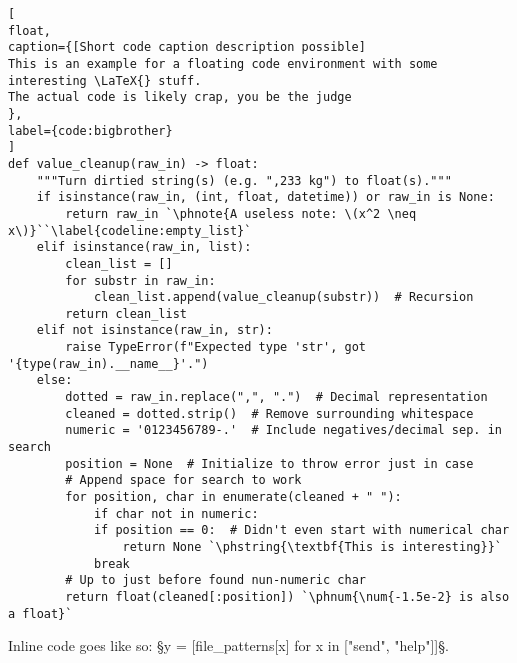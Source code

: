 \begin{lstlisting}[
float,
caption={[Short code caption description possible]
This is an example for a floating code environment with some interesting \LaTeX{} stuff.
The actual code is likely crap, you be the judge
},
label={code:bigbrother}
]
def value_cleanup(raw_in) -> float:
	"""Turn dirtied string(s) (e.g. ",233 kg") to float(s)."""
	if isinstance(raw_in, (int, float, datetime)) or raw_in is None:
		return raw_in `\phnote{A useless note: \(x^2 \neq x\)}``\label{codeline:empty_list}`
	elif isinstance(raw_in, list):
		clean_list = []
		for substr in raw_in:
			clean_list.append(value_cleanup(substr))  # Recursion
		return clean_list
	elif not isinstance(raw_in, str):
		raise TypeError(f"Expected type 'str', got '{type(raw_in).__name__}'.")
	else:
		dotted = raw_in.replace(",", ".")  # Decimal representation
		cleaned = dotted.strip()  # Remove surrounding whitespace
		numeric = '0123456789-.'  # Include negatives/decimal sep. in search
		position = None  # Initialize to throw error just in case
		# Append space for search to work
		for position, char in enumerate(cleaned + " "):
			if char not in numeric:
			if position == 0:  # Didn't even start with numerical char
				return None `\phstring{\textbf{This is interesting}}`
			break
		# Up to just before found nun-numeric char
		return float(cleaned[:position]) `\phnum{\num{-1.5e-2} is also a float}`
\end{lstlisting}

Inline code goes like so: §y = [file_patterns[x] for x in ["send", "help"]]§.

